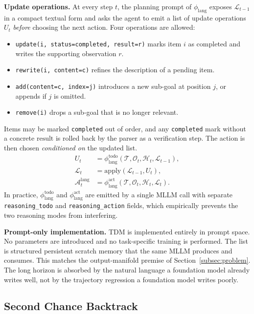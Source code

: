 \documentclass[conference]{IEEEtran}
\begin{document}
\textbf{Update operations.} At every step $t$, the planning prompt of
$\phi_{\mathrm{lang}}$ exposes $\mathcal{L}_{t-1}$ in a compact textual form
and asks the agent to emit a list of update operations $U_t$ \emph{before}
choosing the next action. Four operations are allowed:
\begin{itemize}
  \item \texttt{update(i, status=completed, result=r)} marks item
  $i$ as completed and writes the supporting observation $r$.
  \item \texttt{rewrite(i, content=c)} refines the description of
  a pending item.
  \item \texttt{add(content=c, index=j)} introduces a new sub-goal
  at position $j$, or appends if $j$ is omitted.
  \item \texttt{remove(i)} drops a sub-goal that is no longer
  relevant.
\end{itemize}
Items may be marked \texttt{completed} out of order, and any
\texttt{completed} mark without a concrete $\mathrm{result}$ is rolled back by
the parser as a verification step. The action is then chosen \emph{conditioned
on} the updated list.
\begin{align}
U_t &= \phi_{\mathrm{lang}}^{\mathrm{todo}}(\mathcal{T},
\mathcal{O}_t,\mathcal{H}_t,\mathcal{L}_{t-1}), \\
\mathcal{L}_t &= \mathrm{apply}(\mathcal{L}_{t-1}, U_t), \\
\mathcal{A}^{\mathrm{lang}}_t &= \phi_{\mathrm{lang}}^{\mathrm{act}}(
\mathcal{T},\mathcal{O}_t,\mathcal{H}_t,\mathcal{L}_t).
\end{align}
In practice, $\phi_{\mathrm{lang}}^{\mathrm{todo}}$ and
$\phi_{\mathrm{lang}}^{\mathrm{act}}$ are emitted by a single MLLM call with
separate \texttt{reasoning\_todo} and \texttt{reasoning\_action} fields, which
empirically prevents the two reasoning modes from interfering.

\textbf{Prompt-only implementation.} TDM is implemented entirely in prompt
space. No parameters are introduced and no task-specific training is
performed. The list is structured persistent scratch memory that the same MLLM
produces and consumes. This matches the output-manifold premise of
Section~\ref{subsec:problem}. The long horizon is absorbed by the natural
language a foundation model already writes well, not by the trajectory
regression a foundation model writes poorly.

\subsection{Second Chance Backtrack}
\label{subsec:scb}
\end{document}
